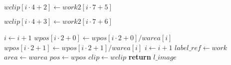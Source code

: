 \begin{algorithm}[ht]
\begin{algorithmic}[1]
		\label{alg:arlabeling-calcregiondata-endcoord-start}
			\State $\mathit{wclip}\left[i \cdot 4 + 2\right] \gets \mathit{work2}\left[i \cdot 7 + 5\right]$
		\EndIf

			\State $\mathit{wclip}\left[i \cdot 4 + 3\right] \gets \mathit{work2}\left[i \cdot 7 + 6\right]$
		\EndIf
		\label{alg:arlabeling-calcregiondata-endcoord-end}

		\State $i \gets i + 1$
	\EndFor
	\label{alg:arlabeling-calcregiondata-work-end}
	\label{alg:arlabeling-calcregiondata-pos-start}
		\State $\mathit{wpos}\left[i \cdot 2 + 0\right] \gets \mathit{wpos}\left[i \cdot 2 + 0\right] / \mathit{warea}\left[i\right]$
		\State $\mathit{wpos}\left[i \cdot 2 + 1\right] \gets \mathit{wpos}\left[i \cdot 2 + 1\right] / \mathit{warea}\left[i\right]$
		\State $i \gets i + 1$
	\EndFor
	\label{alg:arlabeling-calcregiondata-pos-end}
	\State $\mathit{label\_ref} \gets \mathit{work}$
	\State $\mathit{area} \gets \mathit{warea}$
	\State $\mathit{pos} \gets \mathit{wpos}$
	\State $\mathit{clip} \gets \mathit{wclip}$
	\State \textbf{return} $\mathit{l\_image}$
\end{algorithmic}
\end{algorithm}
